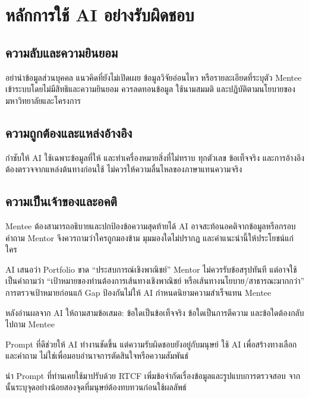 \section{หลักการใช้ AI อย่างรับผิดชอบ}
\subsection{ความลับและความยินยอม}
อย่านำข้อมูลส่วนบุคคล แนวคิดที่ยังไม่เปิดเผย ข้อมูลวิจัยอ่อนไหว หรือรายละเอียดที่ระบุตัว Mentee เข้าระบบโดยไม่มีสิทธิและความยินยอม ควรลดทอนข้อมูล ใช้นามสมมติ และปฏิบัติตามนโยบายของมหาวิทยาลัยและโครงการ

\subsection{ความถูกต้องและแหล่งอ้างอิง}
กำชับให้ AI ใช้เฉพาะข้อมูลที่ให้ และทำเครื่องหมายสิ่งที่ไม่ทราบ ทุกตัวเลข ข้อเท็จจริง และการอ้างอิงต้องตรวจจากแหล่งต้นทางก่อนใช้ ไม่ควรให้ความลื่นไหลของภาษาแทนความจริง

\subsection{ความเป็นเจ้าของและอคติ}
Mentee ต้องสามารถอธิบายและปกป้องข้อความสุดท้ายได้ AI อาจสะท้อนอคติจากข้อมูลหรือกรอบคำถาม Mentor จึงควรถามว่าใครถูกมองข้าม มุมมองใดไม่ปรากฏ และคำแนะนำนี้ให้ประโยชน์แก่ใคร

\begin{examplebox}
AI เสนอว่า Portfolio ขาด \enquote{ประสบการณ์เชิงพาณิชย์} Mentor ไม่ควรรับข้อสรุปทันที แต่อาจใช้เป็นคำถามว่า \enquote{เป้าหมายของท่านต้องการเส้นทางเชิงพาณิชย์ หรือเส้นทางนโยบาย/สาธารณะมากกว่า} การตรวจเป้าหมายก่อนแก้ Gap ป้องกันไม่ให้ AI กำหนดนิยามความสำเร็จแทน Mentee
\end{examplebox}

\begin{mentornote}
หลังอ่านผลจาก AI ให้ถามสามข้อเสมอ: ข้อใดเป็นข้อเท็จจริง ข้อใดเป็นการตีความ และข้อใดต้องกลับไปถาม Mentee
\end{mentornote}

\begin{keytakeaway}
Prompt ที่ดีช่วยให้ AI ทำงานชัดขึ้น แต่ความรับผิดชอบยังอยู่กับมนุษย์ ใช้ AI เพื่อสร้างทางเลือกและคำถาม ไม่ใช่เพื่อมอบอำนาจการตัดสินใจหรือความสัมพันธ์
\end{keytakeaway}

\begin{reflection}
นำ Prompt ที่ท่านเคยใช้มาปรับด้วย RTCF เพิ่มข้อจำกัดเรื่องข้อมูลและรูปแบบการตรวจสอบ จากนั้นระบุจุดอย่างน้อยสองจุดที่มนุษย์ต้องทบทวนก่อนใช้ผลลัพธ์
\blankline\blankline
\end{reflection}

